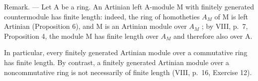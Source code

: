Remark. --- Let A be a ring. An Artinian left A-module M with finitely generated countermodule has finite length: indeed, the ring of homotheties \(A_{M}\) of M is left Artinian (Proposition 6), and M is an Artinian module over \(A_{M}\) ; by VIII, p.~7, Proposition 4, the module M has finite length over \(A_{M}\) and therefore also over A.

In particular, every finitely generated Artinian module over a commutative ring has finite length. By contrast, a finitely generated Artinian module over a noncommutative ring is not necessarily of finite length (VIII, p.~16, Exercise 12).

